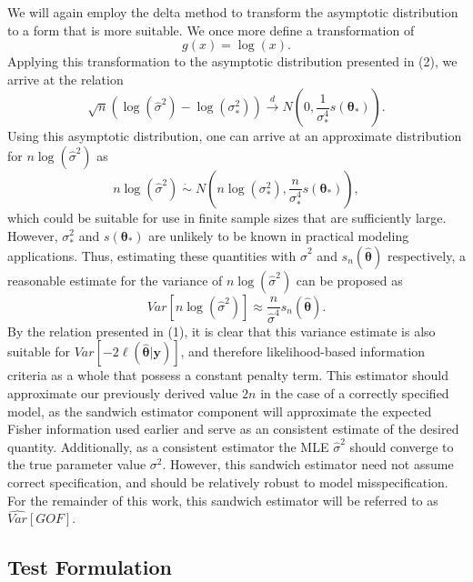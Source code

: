 \documentclass[sn-mathphys-ay]{sn-jnl}
\begin{document}
		We will again employ the delta method to transform the asymptotic distribution to a form that is more suitable. We once more define a transformation of
		\begin{equation*}
			g(x) = \log(x) .
		\end{equation*}
		Applying this transformation to the asymptotic distribution presented in (2), we arrive at the relation
		\begin{equation*}
			\sqrt{n} ( \log (\hat{\sigma}^2) - \log(\sigma_*^2)) \xrightarrow[]{d} N \left( 0, \frac{1}{\sigma_*^4} s(\bm{\theta}_*) \right) .
		\end{equation*}
		Using this asymptotic distribution, one can arrive at an approximate distribution for $n\log(\hat{\sigma}^2)$ as
		\begin{equation*}
			n\log(\hat{\sigma}^2) \; \dot\sim \; N \left( n\log(\sigma_* ^2), \frac{n}{\sigma_*^4} s(\bm{\theta}_*) \right) ,
		\end{equation*}
		which could be suitable for use in finite sample sizes that are sufficiently large. However, $\sigma_*^2$ and $s(\bm{\theta}_*)$ are unlikely to be known in practical modeling
		applications. Thus, estimating these quantities with $\hat{\sigma}^2$ and $s_n(\hat{\bm{\theta}})$ respectively, a reasonable estimate for the variance of $n\log(\hat{\sigma}^2)$ can
		be proposed as
		\begin{equation*}
			Var \left[ n\log(\hat{\sigma}^2) \right] \approx \frac{n}{\hat{\sigma}^4} s_n(\hat{\bm{\theta}}) .
		\end{equation*}
		By the relation presented in (1), it is clear that this variance estimate is also suitable for $Var \left[ -2 \ell (\hat{\bm{\theta}} | \bm{y} ) \right]$, and therefore
		likelihood-based information criteria as a whole that possess a constant penalty term. This estimator should approximate our previously derived value $2n$ in the case of a correctly
		specified model, as the sandwich estimator component will approximate the expected Fisher information used earlier and serve as an consistent estimate of the desired quantity. Additionally, as a consistent estimator the MLE $\hat{\sigma}^2$ should converge to the true
		parameter value $\sigma^2$. However, this sandwich estimator need not assume correct specification, and should be relatively robust to model misspecification. For the remainder of this work, this sandwich estimator will be referred to as $\widehat{Var}[GOF]$.

		\subsection{Test Formulation}
\end{document}
